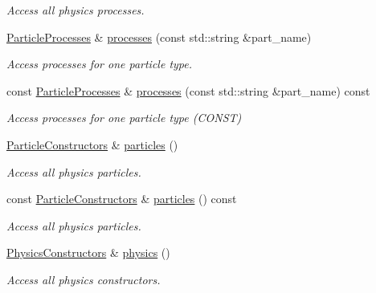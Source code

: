 \begin{DoxyCompactItemize}
\begin{DoxyCompactList}\small\item\em Access all physics processes. \end{DoxyCompactList}\item 
\hyperlink{class_d_d4hep_1_1_simulation_1_1_geant4_physics_list_adf5c4ae6ed4befac883cf5f253f4220e}{Particle\+Processes} \& \hyperlink{class_d_d4hep_1_1_simulation_1_1_geant4_physics_list_afb286f542ca7d94a0eb1831dd340c846}{processes} (const std\+::string \&part\+\_\+name)
\begin{DoxyCompactList}\small\item\em Access processes for one particle type. \end{DoxyCompactList}\item 
const \hyperlink{class_d_d4hep_1_1_simulation_1_1_geant4_physics_list_adf5c4ae6ed4befac883cf5f253f4220e}{Particle\+Processes} \& \hyperlink{class_d_d4hep_1_1_simulation_1_1_geant4_physics_list_a761f0e6fcc0e3c9ab8e7c4895d6c0aa0}{processes} (const std\+::string \&part\+\_\+name) const
\begin{DoxyCompactList}\small\item\em Access processes for one particle type (C\+O\+N\+ST) \end{DoxyCompactList}\item 
\hyperlink{class_d_d4hep_1_1_simulation_1_1_geant4_physics_list_afaee3763aea79b299830be37f9642342}{Particle\+Constructors} \& \hyperlink{class_d_d4hep_1_1_simulation_1_1_geant4_physics_list_a273a6db05b6ea5a2b9a8a2491fbd2d7a}{particles} ()
\begin{DoxyCompactList}\small\item\em Access all physics particles. \end{DoxyCompactList}\item 
const \hyperlink{class_d_d4hep_1_1_simulation_1_1_geant4_physics_list_afaee3763aea79b299830be37f9642342}{Particle\+Constructors} \& \hyperlink{class_d_d4hep_1_1_simulation_1_1_geant4_physics_list_a605e059b518909ab446396fd5a8035cb}{particles} () const
\begin{DoxyCompactList}\small\item\em Access all physics particles. \end{DoxyCompactList}\item 
\hyperlink{class_d_d4hep_1_1_simulation_1_1_geant4_physics_list_a5953826b626c21fa4b26ab9a07f3b8ad}{Physics\+Constructors} \& \hyperlink{class_d_d4hep_1_1_simulation_1_1_geant4_physics_list_a02c18b4acdacd390c3c1b1c4609f1c7b}{physics} ()
\begin{DoxyCompactList}\small\item\em Access all physics constructors. \end{DoxyCompactList}\item 

\end{DoxyCompactItemize}
